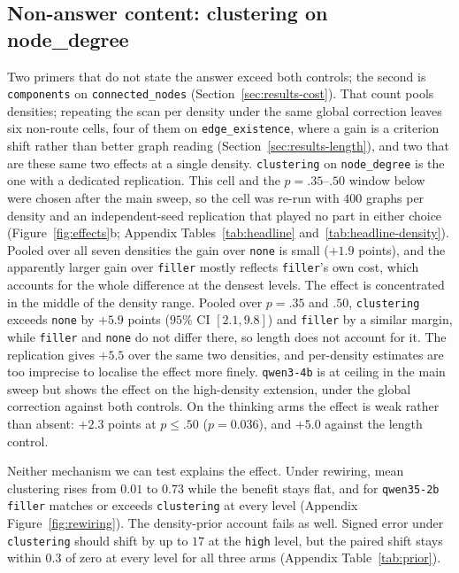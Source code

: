 \documentclass[11pt]{article}
\begin{document}
\subsection{Non-answer content: clustering on node\_degree}
\label{sec:results-clustering}

Two primers that do not state the answer exceed both controls; the second
is \texttt{components} on \texttt{connected\_nodes}
(Section~\ref{sec:results-cost}). That count pools densities; repeating the
scan per density under the same global correction leaves six non-route
cells, four of them on \texttt{edge\_existence}, where a gain is a criterion
shift rather than better graph reading
(Section~\ref{sec:results-length}), and two that are these same two effects
at a single density. \texttt{clustering} on
\texttt{node\_degree} is the one with a dedicated replication. This cell and the
$p{=}.35$--$.50$ window below were chosen after the main sweep, so the cell
was re-run with $400$ graphs per density and an independent-seed
replication that played no part in either choice
(Figure~\ref{fig:effects}b; Appendix
Tables~\ref{tab:headline} and~\ref{tab:headline-density}). Pooled over all
seven densities the gain over \texttt{none} is small ($+1.9$ points), and
the apparently larger gain over \texttt{filler} mostly reflects
\texttt{filler}'s own cost, which accounts for the whole difference at the
densest levels. The effect is concentrated in the middle of the density
range. Pooled over $p{=}.35$ and $.50$, \texttt{clustering} exceeds
\texttt{none} by $+5.9$ points ($95\%$ CI $[2.1, 9.8]$) and \texttt{filler}
by a similar margin, while \texttt{filler} and \texttt{none} do not differ
there, so length does not account for it. The replication gives $+5.5$ over
the same two densities, and per-density estimates are too imprecise to
localise the effect more finely. \texttt{qwen3-4b} is at ceiling in the
main sweep but shows the effect on the high-density extension, under the
global correction against both controls. On the thinking arms the effect is
weak rather than absent: $+2.3$ points at $p\le.50$ ($p{=}0.036$), and
$+5.0$ against the length control.

Neither mechanism we can test explains the effect. Under rewiring, mean
clustering rises from $0.01$ to $0.73$ while the benefit stays flat, and
for \texttt{qwen35-2b} \texttt{filler} matches or exceeds
\texttt{clustering} at every level (Appendix
Figure~\ref{fig:rewiring}). The density-prior account fails as well.
Signed error under \texttt{clustering} should shift by up to $17$ at the
\texttt{high} level, but the paired shift stays within $0.3$ of zero at
every level for all three arms (Appendix Table~\ref{tab:prior}).
\end{document}
